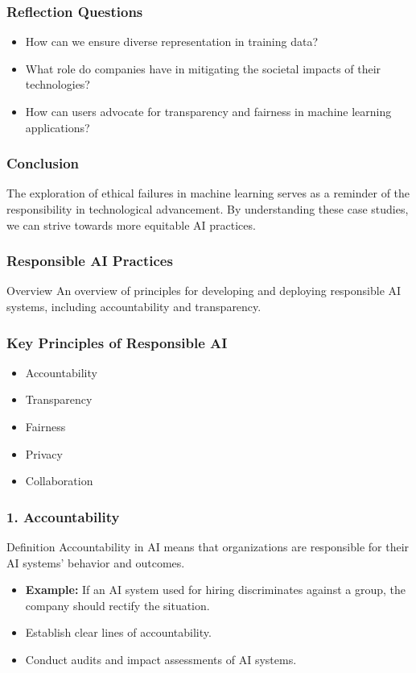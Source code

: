 \documentclass[aspectratio=169]{beamer}
\begin{document}
\begin{frame}[fragile]
    \frametitle{Reflection Questions}
    \begin{itemize}
        \item How can we ensure diverse representation in training data?
        \item What role do companies have in mitigating the societal impacts of their technologies?
        \item How can users advocate for transparency and fairness in machine learning applications?
    \end{itemize}
\end{frame}

\begin{frame}[fragile]
    \frametitle{Conclusion}
    The exploration of ethical failures in machine learning serves as a reminder of the responsibility in technological advancement. By understanding these case studies, we can strive towards more equitable AI practices.
\end{frame}

\begin{frame}[fragile]
    \frametitle{Responsible AI Practices}
    \begin{block}{Overview}
        An overview of principles for developing and deploying responsible AI systems, including accountability and transparency.
    \end{block}
\end{frame}

\begin{frame}[fragile]
    \frametitle{Key Principles of Responsible AI}
    \begin{itemize}
        \item Accountability
        \item Transparency
        \item Fairness
        \item Privacy
        \item Collaboration
    \end{itemize}
\end{frame}

\begin{frame}[fragile]
    \frametitle{1. Accountability}
    \begin{block}{Definition}
        Accountability in AI means that organizations are responsible for their AI systems' behavior and outcomes.
    \end{block}
    \begin{itemize}
        \item \textbf{Example:} If an AI system used for hiring discriminates against a group, the company should rectify the situation.
    \end{itemize}
    \begin{itemize}
        \item Establish clear lines of accountability.
        \item Conduct audits and impact assessments of AI systems.
    \end{itemize}
\end{frame}
\end{document}
